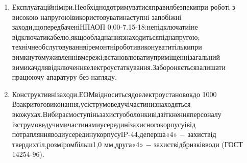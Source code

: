 \begin{enumerate}
	\item Експлуатаційні\hfill міри.\hfill Необхідно\hfill дотримуватися\hfill правил\hfill безпеки\hfill при\newline \hspace*{-18mm} роботі \hfill з \hfill високою напругою\hfill і\hfill використовувати\hfill наступні \hfill запобіжні\newline \hspace*{-18mm} заходи,\hfill що\hfill передбачені\hfill НПАОП 0.00-7.15-18:\hfill не\hfill підключати\hfill і\hfill не\newline \hspace*{-18mm} відключати\hfill кабелю,\hfill якщо\hfill обладнання\hfill знаходиться\hfill під\hfill напругою;\newline \hspace*{-18mm} технічне\hfill обслуговування\hfill і\hfill ремонтні\hfill роботи\hfill виконувати\hfill тільки\hfill при\newline \hspace*{-18mm} вимкнутому\hfill живленні\hfill в\hfill мережі;\hfill встановлювати\hfill у\hfill приміщенні\hfill загальний\newline \hspace*{-18mm} вимикач\hfill для\hfill відключення\hfill електроустаткування.\hfill Забороняється\hfill залишати\newline \hspace*{-18mm} працюючу апаратуру без нагляду.
	\item Конструктивні\hfill заходи.\hfill ЕОМ\hfill відноситься\hfill до\hfill електроустановок\hfill до\newline \hspace*{-18mm} 1000 В\hfill закритого\hfill виконання,\hfill усі\hfill струмоведучі\hfill частини\hfill знаходяться\newline \hspace*{-18mm} в\hfill кожухах.\hfill Вибираємо\hfill ступінь\hfill захисту\hfill оболонки\hfill від\hfill зіткнення\hfill персоналу\newline \hspace*{-18mm} із\hfill струмоведучими\hfill частинами\hfill усередині\hfill захисного\hfill корпусу\hfill і\hfill від\newline \hspace*{-18mm} потрапляння\hfill води\hfill усередину\hfill корпусу\hfill ІP-44,\hfill де\hfill перша\hfill «4» $-$ захист\hfill від\newline \hspace*{-18mm} твердих\hfill тіл,\hfill розміром\hfill більш\hfill 1,0 мм,\hfill друга\hfill «4» $-$ захист\hfill від\hfill бризків\hfill води\newline \hspace*{-18mm} (ГОСТ 14254-96).

\end{enumerate}
